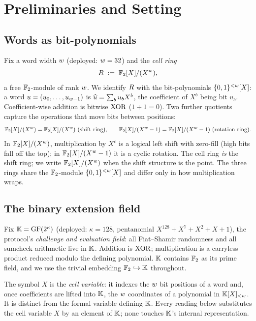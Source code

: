 \section{Preliminaries and Setting}
\label{sec:prelim}

\subsection{Words as bit-polynomials}

Fix a word width $w$ (deployed: $w = 32$) and the \emph{cell ring}
\[
  R \;:=\; \mathbb{F}_2[X]/(X^{w}),
\]
a free $\mathbb{F}_2$-module of rank $w$. We identify $R$ with the
bit-polynomials $\{0,1\}^{<w}[X]$: a word $u = (u_0,\dots,u_{w-1})$ is
$\widehat{u} = \sum_b u_b X^b$, the coefficient of $X^b$ being bit $u_b$.
Coefficient-wise addition is bitwise $\operatorname{XOR}$ ($1+1 = 0$). Two further quotients
capture the operations that move bits between positions:
\[
  \Fshift = \Ftwo[X]/(X^{\wbit}) \ \text{(shift ring),}
  \qquad
  \Frot = \Ftwo[X]/(X^{\wbit}-1) \ \text{(rotation ring).}
\]
In $\mathbb{F}_2[X]/(X^{w})$, multiplication by $X^c$ is a logical left shift with zero-fill
(high bits fall off the top); in $\mathbb{F}_2[X]/(X^{w}-1)$ it is a cyclic rotation. The cell ring
\emph{is} the shift ring; we write $\mathbb{F}_2[X]/(X^{w})$ when the shift structure is the
point. The three rings share the $\mathbb{F}_2$-module $\{0,1\}^{<w}[X]$ and differ
only in how multiplication wraps.

\subsection{The binary extension field}

Fix $\mathbb{K} = \mathrm{GF}(2^{\kappa})$ (deployed: $\kappa = 128$, pentanomial
$X^{128}+X^7+X^2+X+1$), the protocol's \emph{challenge and evaluation field}:
all Fiat--Shamir randomness and all sumcheck arithmetic live in $\mathbb{K}$. Addition
is $\operatorname{XOR}$; multiplication is a carryless product reduced modulo the defining
polynomial. $\mathbb{K}$ contains $\mathbb{F}_2$ as its prime field, and we use the trivial
embedding $\mathbb{F}_2\hookrightarrow\mathbb{K}$ throughout.

\begin{remark}
\label{rem:two-X}
The symbol $X$ is the \emph{cell variable}: it indexes the $w$ bit
positions of a word and, once coefficients are lifted into $\mathbb{K}$, the $w$
coordinates of a polynomial in $\mathbb{K}[X]_{<w}$. It is distinct from the formal variable
defining $\mathbb{K}$. Every reading below substitutes the cell variable $X$ by an
element of $\mathbb{K}$; none touches $\mathbb{K}$'s internal representation.
\end{remark}

